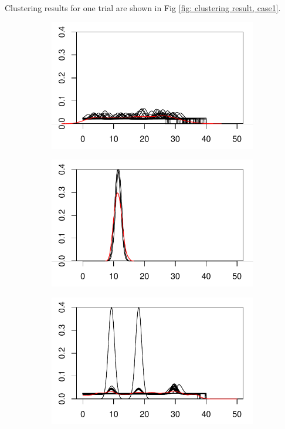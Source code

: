\noindent
Clustering results for one trial are shown in Fig \ref{fig: clustering result, case1}.
\\
\begin{figure}[H]
\begin{minipage}{.49\textwidth}
\begin{subfigure}{\linewidth}
\includegraphics[width=\linewidth]{../simulation/plots/case1_clus1.pdf}
\end{subfigure}
\begin{subfigure}{\linewidth}
\includegraphics[width=\linewidth]{../simulation/plots/case1_clus2.pdf}
\end{subfigure}
\end{minipage}
\begin{minipage}{.49\textwidth}
\begin{subfigure}{\linewidth}
\includegraphics[width=\linewidth]{../simulation/plots/pp_case1_clus1.pdf}

\end{subfigure}
\end{minipage}
\end{figure}

